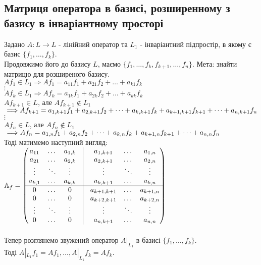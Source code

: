 \documentclass[a4paper, 10pt]{article}
\theoremstyle{theoremdd}
\begin{document}
\subsection{Матриця оператора в базисі, розширенному з базису в інваріантному просторі}
Задано $A: L \to L$ - лінійний оператор та $L_1$ - інваріантний підпростір, в якому є базис $\{f_1,\dots, f_k\}$.\\
Продовжимо його до базису $L$, маємо $\{f_1,\dots,f_k,f_{k+1},\dots,f_n\}$. Мета: знайти матрицю для розширеного базису.\\
$Af_1 \in L_1 \Rightarrow Af_1 = a_{11}f_1 + a_{21}f_2 + \dots + a_{k1}f_k$\\
$\vdots$\\
$Af_k \in L_1 \Rightarrow Af_k = a_{1k}f_1 + a_{2k}f_2 + \dots + a_{kk}f_k$\\
$Af_{k+1} \in L $, але $Af_{k+1} \not\in L_1$ $\implies \\ Af_{k+1} = a_{1,k+1}f_1 + a_{2,k+1}f_2 + \dots + a_{k,k+1}f_k + a_{k+1,k+1}f_{k+1} + \dots + a_{n,k+1}f_n$\\
$\vdots$\\
$Af_n \in L $, але $Af_n \not\in L_1$ $\implies \\ Af_n = a_{1,n}f_1 + a_{2,n}f_2 + \dots + a_{k,n}f_k + a_{k+1,n}f_{k+1} + \dots + a_{n,n}f_n$\\
Тоді матимемо наступний вигляд:\\
$\mathbb{A}_f = \begin{pmatrix}
a_{11} & \dots & a_{1,k} & \vline & a_{1,k+1} & \dots & a_{1, n} \\
a_{21} & \dots & a_{2,k} & \vline & a_{2,k+1} & \dots & a_{2, n} \\
\vdots & \ddots & \vdots & \vline & \vdots & \ddots & \vdots \\
a_{k,1} & \dots & a_{k,k} & \vline & a_{k,k+1} & \dots & a_{k, n} \\
\hline
0 & \dots & 0 & \vline & a_{k+1,k+1} & \dots & a_{k+1, n} \\
0 & \dots & 0 & \vline & a_{k+2,k+1} &  \dots & a_{k+2, n} \\
\vdots & \ddots & \vdots & \vline & \vdots & \ddots & \vdots \\
0 & \dots & 0 & \vline & a_{n,k+1} & \dots & a_{n, n} \\
\end{pmatrix}$\\
\\
Тепер розглянемо звужений оператор $A|_{L_1}$ в базисі $\{f_1,\dots,f_k\}$.\\ Тоді $A|_{L_1} f_1 = Af_1 , \dots, A|_{L_1}f_k = Af_k$.\\
\end{document}
